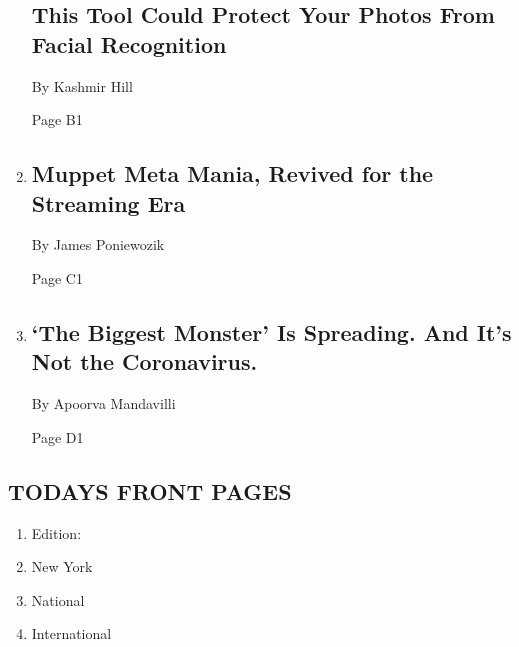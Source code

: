 \begin{enumerate}
  \hypertarget{this-tool-could-protect-your-photos-from-facial-recognition}{%
  \subsection{This Tool Could Protect Your Photos From Facial
  Recognition}\label{this-tool-could-protect-your-photos-from-facial-recognition}}

  By Kashmir Hill

  Page B1
\item
  \href{/2020/07/31/arts/television/muppets-now.html}{}

  \hypertarget{muppet-meta-mania-revived-for-the-streaming-era}{%
  \subsection{Muppet Meta Mania, Revived for the Streaming
  Era}\label{muppet-meta-mania-revived-for-the-streaming-era}}

  By James Poniewozik

  Page C1
\item
  \href{/2020/08/03/health/coronavirus-tuberculosis-aids-malaria.html}{}

  \hypertarget{the-biggest-monster-is-spreading-and-its-not-the-coronavirus}{%
  \subsection{`The Biggest Monster' Is Spreading. And It's Not the
  Coronavirus.}\label{the-biggest-monster-is-spreading-and-its-not-the-coronavirus}}

  By Apoorva Mandavilli

  Page D1
\end{enumerate}

\hypertarget{todays-front-pages}{%
\subsection{TODAYS FRONT PAGES}\label{todays-front-pages}}

\begin{enumerate}
\def\labelenumi{\arabic{enumi}.}
\tightlist
\item
  Edition:
\item
  New York
\item
  National
\item
  International
\end{enumerate}

\href{http://app.nytimes3xbfgragh.onion/todayspaper}{}

